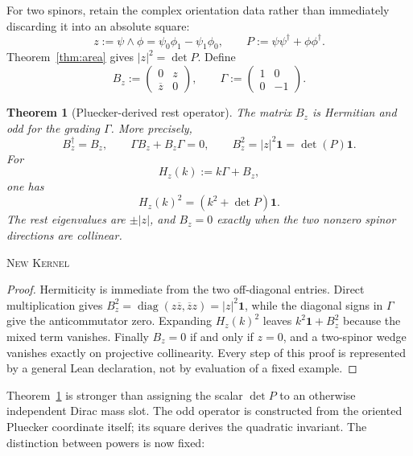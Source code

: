 \documentclass[11pt]{article}
\newcommand{\Kernel}{\textcolor{kernelcolor}{\textsc{Kernel}}}
\newcommand{\NewResult}{\textsc{New}}
\newcommand{\diag}{\operatorname{diag}}
\newcommand{\id}{\mathbf{1}}
\newtheorem{theorem}{Theorem}[section]
\begin{document}
For two spinors, retain the complex orientation data rather than immediately
discarding it into an absolute square:
\begin{equation}
 z:=\psi\wedge\phi=\psi_0\phi_1-\psi_1\phi_0,
 \qquad
 P:=\psi\psi^\dagger+\phi\phi^\dagger.
\end{equation}
Theorem~\ref{thm:area} gives $|z|^2=\det P$.  Define
\begin{equation}\label{eq:Bz}
 B_z:=\begin{pmatrix}0&z\\ \overline z&0\end{pmatrix},
 \qquad
 \Gamma:=\begin{pmatrix}1&0\\0&-1\end{pmatrix}.
\end{equation}

\begin{theorem}[Pluecker-derived rest operator]\label{thm:Bz}
The matrix $B_z$ is Hermitian and odd for the grading $\Gamma$.  More
precisely,
\begin{equation}\label{eq:Bzidentities}
 B_z^\dagger=B_z,
 \qquad
 \Gamma B_z+B_z\Gamma=0,
 \qquad
 B_z^2=|z|^2\id=\det(P)\id.
\end{equation}
For
\begin{equation}\label{eq:Hz}
 H_z(k):=k\Gamma+B_z,
\end{equation}
one has
\begin{equation}\label{eq:hero}
 \boxed{H_z(k)^2=\left(k^2+\det P\right)\id}.
\end{equation}
The rest eigenvalues are $\pm|z|$, and $B_z=0$ exactly when the two nonzero
spinor directions are collinear.
\end{theorem}
\noindent\NewResult{} \Kernel{}

\begin{proof}
Hermiticity is immediate from the two off-diagonal entries.  Direct
multiplication gives
$B_z^2=\diag(z\overline z,\overline z z)=|z|^2\id$, while the diagonal signs
in $\Gamma$ give the anticommutator zero.  Expanding $H_z(k)^2$ leaves
$k^2\id+B_z^2$ because the mixed term vanishes.  Finally $B_z=0$ if and only
if $z=0$, and a two-spinor wedge vanishes exactly on projective collinearity.
Every step of this proof is represented by a general Lean declaration, not by
evaluation of a fixed example.
\end{proof}

Theorem~\ref{thm:Bz} is stronger than assigning the scalar $\det P$ to an
otherwise independent Dirac mass slot.  The odd operator is constructed from
the oriented Pluecker coordinate itself; its square derives the quadratic
invariant.  The distinction between powers is now fixed:
\end{document}
